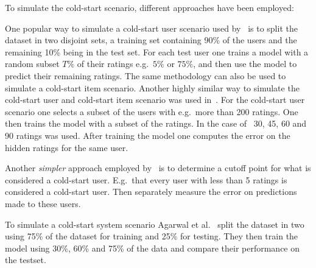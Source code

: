 To simulate the cold-start scenario, different approaches have been employed:

One popular way to simulate a cold-start user scenario used by~\cite{Stern2009,
Lam2008} is to split the dataset in two disjoint sets, a training set
containing 90\% of the users and the remaining 10\% being in the test set. For
each test user one trains a model with a random subset $T\%$ of their ratings
e.g.\ $5\%$ or $75\%$, and then use the model to predict their remaining
ratings. The same methodology can also be used to simulate a cold-start item
scenario. Another highly similar way to simulate the cold-start user and
cold-start item scenario was used in~\cite{Rashid2002, Rashid2008}. For the
cold-start user scenario one selects a subset of the users with e.g.\ more than
200 ratings. One then trains the model with a subset of the ratings. In the
case of~\cite{Rashid2002} 30, 45, 60 and 90 ratings was used. After training
the model one computes the error on the hidden ratings for the same user.

Another \emph{simpler} approach employed by~\cite{Massa2007, Jamali2009} is to
determine a cutoff point for what is considered a cold-start user. E.g.\ that
every user with less than 5 ratings is considered a cold-start user. Then
separately measure the error on predictions made to these users.

To simulate a cold-start system scenario Agarwal et al.~\cite{Agarwal2009}
split the dataset in two using 75\% of the dataset for training and 25\% for
testing. They then train the model using 30\%, 60\% and 75\% of the data and
compare their performance on the testset.




